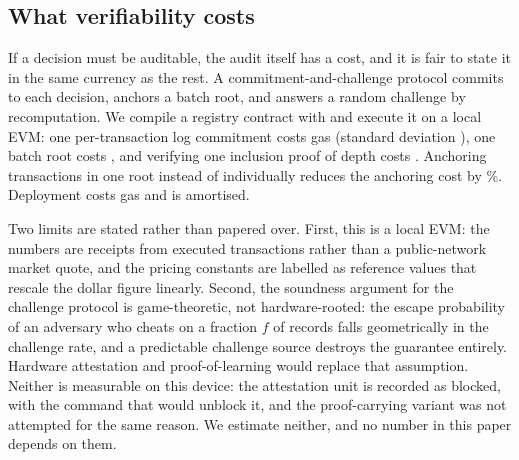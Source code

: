 \subsection{What verifiability costs}

If a decision must be auditable, the audit itself has a cost, and it is fair to
state it in the same currency as the rest. A commitment-and-challenge protocol
commits to each decision, anchors a batch root, and answers a random challenge by
recomputation. We compile a registry contract with \SolcVer{} and execute it on a
local EVM: one per-transaction log commitment costs \GasPerTx{} gas (standard
deviation \GasPerTxSd), one batch root costs \GasBatch, and verifying one inclusion
proof of depth \MerkleDepth{} costs \GasVerify. Anchoring \GasBatchSize{}
transactions in one root instead of individually reduces the anchoring cost by
\GasSavingPct\%. Deployment costs \GasDeploy{} gas and is amortised.

Two limits are stated rather than papered over. First, this is a local EVM: the
numbers are receipts from executed transactions rather than a public-network
market quote, and the pricing constants are labelled as reference values that
rescale the dollar figure linearly. Second, the soundness argument for the
challenge protocol is game-theoretic, not hardware-rooted: the escape probability
of an adversary who cheats on a fraction $f$ of records falls geometrically in the
challenge rate, and a predictable challenge source destroys the guarantee
entirely. Hardware attestation \cite{costan2016sgx} and proof-of-learning
\cite{jia2021proof} would replace that assumption. Neither is measurable on this
device: the attestation unit is recorded as blocked, with the command that would
unblock it, and the proof-carrying variant was not attempted for the same reason.
We estimate neither, and no number in this paper depends on them.
